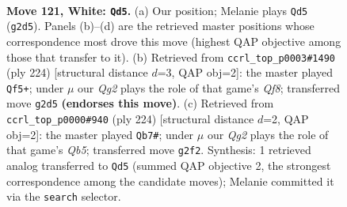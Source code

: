 \documentclass[11pt]{article}
\begin{document}
\begin{figure}[p]\centering
\begin{subfigure}{0.46\textwidth}\centering
\resizebox{\linewidth}{!}{%
\newchessgame
\chessboard[
  setfen={5k2/8/8/8/8/6K1/6Q1/8 w - - 21 121},
  showmover=false,
  pgfstyle=straightmove, color=movearrow, markmove={g2-d5}
]}
\caption{}
\end{subfigure}\hfill
\begin{subfigure}{0.46\textwidth}\centering
\resizebox{\linewidth}{!}{%
\newchessgame
\chessboard[
  setfen={5Q2/4K3/1r6/3k4/8/8/8/8 w - - 1 113},
  showmover=false,
  pgfstyle=straightmove, color=movearrow, markmove={f8-f5}
]}
\caption{}
\end{subfigure}
\\[4pt]
\begin{subfigure}{0.46\textwidth}\centering
\resizebox{\linewidth}{!}{%
\newchessgame
\chessboard[
  setfen={8/k7/2K5/1Q6/8/8/8/8 w - - 11 113},
  showmover=false,
  pgfstyle=straightmove, color=movearrow, markmove={b5-b7}
]}
\caption{}
\end{subfigure}\hfill

\caption{\textbf{Move 121, White: \texttt{Qd5}.} (a) Our position; Melanie plays \texttt{Qd5} (\texttt{g2d5}). Panels (b)--(d) are the retrieved master positions whose correspondence most drove this move (highest QAP objective among those that transfer to it). (b) Retrieved from \texttt{ccrl\_top\_p0003\#1490} (ply 224) [structural distance $d$=3, QAP obj=2]: the master played \texttt{Qf5+}; under $\mu$ our \emph{Qg2} plays the role of that game's \emph{Qf8}; transferred move \texttt{g2d5} \textbf{(endorses this move)}. (c) Retrieved from \texttt{ccrl\_top\_p0000\#940} (ply 224) [structural distance $d$=2, QAP obj=2]: the master played \texttt{Qb7\#}; under $\mu$ our \emph{Qg2} plays the role of that game's \emph{Qb5}; transferred move \texttt{g2f2}. Synthesis: 1 retrieved analog transferred to \texttt{Qd5} (summed QAP objective 2, the strongest correspondence among the candidate moves); Melanie committed it via the \texttt{search} selector.}
\label{fig:thought-m240}
\end{figure}

\clearpage
\end{document}
